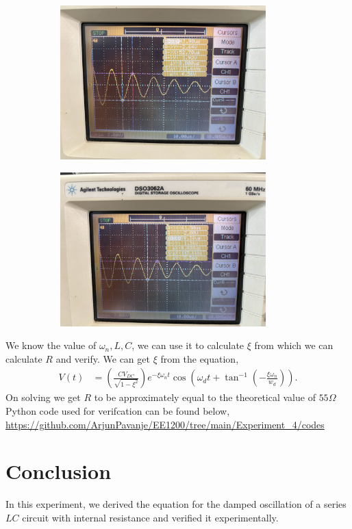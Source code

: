 \documentclass[a4paper,12pt]{article}
\begin{document}
\begin{figure}[h!]
\begin{subfigure}[b]{100pt}
		\includegraphics[width = 225pt]{figs/fig5.jpg}
	\end{subfigure}
	\hspace{110pt}
\begin{subfigure}[b]{100pt}
		\includegraphics[width = 225pt]{figs/fig6.jpg}
	\end{subfigure}
\end{figure}
We know the value of $\omega_n, L, C$, we can use it to calculate $\xi$ from which we can calculate $R$ and verify. We can get $\xi$ from the equation, 
\begin{align*}
   V(t) &= \left(\frac{CV_{DC}}{\sqrt{1-\xi^2}} \right) e^{-\xi \omega_n t}\cos\left(\omega_d t + \tan^{-1}\left(-\frac{\xi \omega_n}{w_d}\right)\right). 
\end{align*}
On solving we get $R$ to be approximately equal to the theoretical value of $55\Omega$
\newline Python code used for verifcation can be found below,
\newline
\url{https://github.com/ArjunPavanje/EE1200/tree/main/Experiment_4/codes} 
\section{Conclusion}
In this experiment, we derived the equation for the damped oscillation of a series $LC$ circuit with internal resistance and verified it experimentally.
\end{document}
